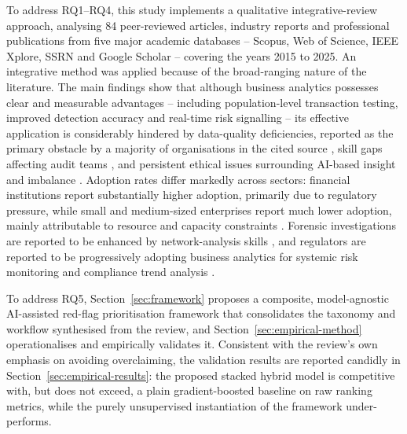 \documentclass[preprint,12pt]{elsarticle}
\begin{document}
To address RQ1--RQ4, this study implements a qualitative integrative-review approach, analysing 84 peer-reviewed articles, industry reports and professional publications from five major academic databases -- Scopus, Web of Science, IEEE Xplore, SSRN and Google Scholar -- covering the years 2015 to 2025. An integrative method was applied because of the broad-ranging nature of the literature. The main findings show that although business analytics possesses clear and measurable advantages -- including population-level transaction testing, improved detection accuracy and real-time risk signalling -- its effective application is considerably hindered by data-quality deficiencies, reported as the primary obstacle by a majority of organisations in the cited source \citep{wolniak2024}, skill gaps affecting audit teams \citep{vesty2023}, and persistent ethical issues surrounding AI-based insight and imbalance \citep{landers2023}. Adoption rates differ markedly across sectors: financial institutions report substantially higher adoption, primarily due to regulatory pressure, while small and medium-sized enterprises report much lower adoption, mainly attributable to resource and capacity constraints \citep{kothandapani2025,fiolleau2024}. Forensic investigations are reported to be enhanced by network-analysis skills \citep{hezam2023}, and regulators are reported to be progressively adopting business analytics for systemic risk monitoring and compliance trend analysis \citep{syam2025}.

To address RQ5, Section~\ref{sec:framework} proposes a composite, model-agnostic AI-assisted red-flag prioritisation framework that consolidates the taxonomy and workflow synthesised from the review, and Section~\ref{sec:empirical-method} operationalises and empirically validates it. Consistent with the review's own emphasis on avoiding overclaiming, the validation results are reported candidly in Section~\ref{sec:empirical-results}: the proposed stacked hybrid model is competitive with, but does not exceed, a plain gradient-boosted baseline on raw ranking metrics, while the purely unsupervised instantiation of the framework under-performs.
\end{document}

